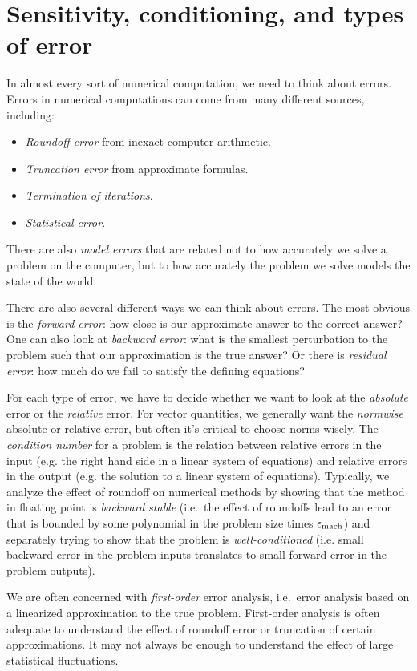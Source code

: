 \documentclass[12pt, leqno]{article}
\begin{document}
\section{Sensitivity, conditioning, and types of error}

In almost every sort of numerical computation, we need to think about
errors.  Errors in numerical computations can come from many different
sources, including:
\begin{itemize}
\item {\em Roundoff error} from inexact computer arithmetic.
\item {\em Truncation error} from approximate formulas.
\item {\em Termination of iterations}.
\item {\em Statistical error}.
\end{itemize}
There are also {\em model errors} that are related not to how
accurately we solve a problem on the computer, but to how accurately
the problem we solve models the state of the world.

There are also several different ways we can think about errors.  The
most obvious is the {\em forward error}: how close is our approximate
answer to the correct answer?  One can also look at {\em backward
  error}: what is the smallest perturbation to the problem such that
our approximation is the true answer?  Or there is {\em residual
  error}: how much do we fail to satisfy the defining equations?

For each type of error, we have to decide whether we want to look at
the {\em absolute} error or the {\em relative} error.  For vector
quantities, we generally want the {\em normwise} absolute or relative
error, but often it's critical to choose norms wisely.  The
{\em condition number} for a problem is the relation between relative
errors in the input (e.g. the right hand side in a linear system of
equations) and relative errors in the output (e.g. the solution to a
linear system of equations).  Typically, we analyze the effect of
roundoff on numerical methods by showing that the method in floating
point is {\em backward stable} (i.e.~the effect of roundoffs lead to
an error that is bounded by some polynomial in the problem size
times $\epsilon_{\mathrm{mach}}$) and separately trying to show that the problem is
{\em well-conditioned} (i.e. small backward error in the problem inputs
translates to small forward error in the problem outputs).

We are often concerned with {\em first-order} error analysis,
i.e.~error analysis based on a linearized approximation to the true
problem.  First-order analysis is often adequate to understand the
effect of roundoff error or truncation of certain approximations.
It may not always be enough to understand the effect of large
statistical fluctuations.
\end{document}
